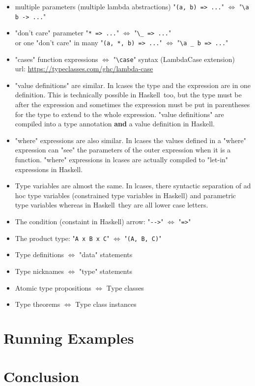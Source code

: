 \documentclass{article}
\def\H{Haskell}
\def\r{$\Longleftrightarrow$ }
\begin{document}
\begin{itemize}
\item
multiple parameters (multiple lambda abstractions) "\verb|(a, b) => ...|" \r
"\verb|\a b -> ...|"

\item
"don't care" parameter
"\verb|* => ...|" \r "\verb|\_ => ...|"
\\
or one "don't care" in many
"\verb|(a, *, b) => ...|" \r "\verb|\a _ b => ...|"

\item
"cases" function expressions \r "\verb|\case|" syntax
(LambdaCase extension) \\
url: \url{https://typeclasses.com/ghc/lambda-case}

\item
"value definitions" are similar. In lcases the type and the expression are in
one definition. This is technically possible in \H\ too, but the type must be
after the expression and sometimes the expression must be put in parentheses
for the type to extend to the whole expression. "value definitions" are
compiled into a type annotation \textbf{and} a value definition in \H.

\item
"where" expressions are also similar. In lcases the values defined in a 
"where" expression can "see" the parameters of the outer expression when 
it is a function. "where" expressions in lcases are actually compiled to 
"let-in" expressions in \H.

\item
Type variables are almost the same. In lcases, there syntactic separation of ad
hoc type variables (constrained type variables in \H) and parametric type
variables whereas in \H\ they are all lower case letters.

\item
The condition (constaint in \H) arrow: "\verb|-->|" \r "\verb|=>|" 

\item
The product type: "\verb|A x B x C|" \r "\verb|(A, B, C)|"

\item
Type definitions \r "data" statements

\item
Type nicknames \r "type" statements

\item
Atomic type propositions \r Type classes

\item
Type theorems \r Type class instances

\end{itemize}

\section{Running Examples}

\section{Conclusion}

\newpage
\printbibliography
\end{document}
